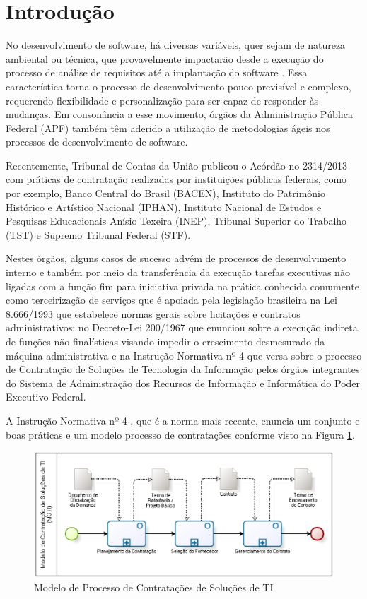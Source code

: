 \section{Introdução}
\label{intro}

No desenvolvimento de software, há diversas variáveis, quer sejam de natureza ambiental ou técnica, que provavelmente impactarão desde a execução do processo de análise de requisitos até a implantação do software \cite{beckarticle1999}. Essa característica torna o processo de desenvolvimento pouco previsível e complexo, requerendo flexibilidade e personalização para ser capaz de responder às mudanças. 
Em consonância a esse movimento, órgãos da Administração Pública Federal (APF) também têm aderido a utilização de metodologias ágeis nos processos de desenvolvimento de software.

Recentemente, Tribunal de Contas da União publicou o Acórdão no 2314/2013 \cite{TCU:2013}
com práticas de contratação realizadas por instituições públicas federais, como por exemplo, Banco Central do Brasil (BACEN), Instituto do Patrimônio Histórico e Artístico Nacional (IPHAN), Instituto Nacional de Estudos e Pesquisas Educacionais Anísio Texeira (INEP), Tribunal Superior do Trabalho (TST) e Supremo Tribunal Federal (STF). 

Nestes órgãos, alguns casos de sucesso advém de processos de desenvolvimento interno e também por meio da transferência da execução tarefas executivas não ligadas com a função fim para iniciativa privada na prática conhecida comumente como terceirização de serviços que é apoiada pela legislação brasileira na Lei 8.666/1993 \cite{Lei8666:1993} que estabelece normas gerais sobre licitações e contratos administrativos; no Decreto-Lei 200/1967 que enunciou sobre a execução indireta de funções não finalísticas visando impedir o crescimento desmesurado da máquina administrativa e na Instrução Normativa nº 4 \cite{IN04:2010} que versa sobre o processo de Contratação de Soluções de Tecnologia da Informação pelos órgãos integrantes do Sistema de Administração dos Recursos de Informação e Informática do Poder Executivo Federal.

A Instrução Normativa nº 4 \cite{IN04:2010}, que é a norma mais recente, enuncia um conjunto e boas práticas e um modelo processo de contratações conforme visto na Figura \ref{processo}. 

\begin{figure}[h]
        \centering
        \label{processo}
            \includegraphics[scale=0.7]{figuras/MCTI.eps}
        \caption{Modelo de Processo de Contratações de Soluções de TI \cite{mcti}}
\end{figure}
\FloatBarrier	


